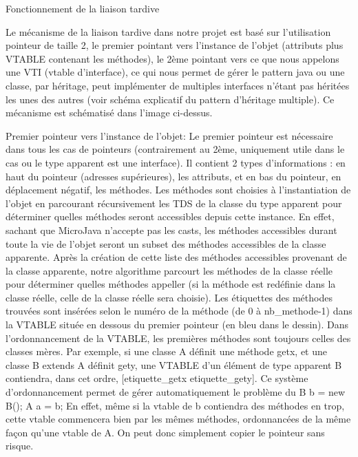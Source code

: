 Fonctionnement de la liaison tardive

Le mécanisme de la liaison tardive dans notre projet est basé sur l'utilisation pointeur de taille 2, le premier pointant vers l'instance de l'objet (attributs plus VTABLE contenant les méthodes), le 2ème pointant vers ce que nous appelons une VTI (vtable d'interface), ce qui nous permet de gérer le pattern java ou une classe, par héritage, peut implémenter de multiples interfaces n'étant pas héritées les unes des autres (voir schéma explicatif du pattern d'héritage multiple). Ce mécanisme est schématisé dans l'image ci-dessus.

Premier pointeur vers l'instance de l'objet:
Le premier pointeur est nécessaire dans tous les cas de pointeurs (contrairement au 2ème, uniquement utile dans le cas ou le type apparent est une interface). Il contient 2 types d'informations : en haut du pointeur (adresses supérieures), les attributs, et en bas du pointeur, en déplacement négatif, les méthodes. Les méthodes sont choisies à l'instantiation de l'objet en parcourant récursivement les TDS de la classe du type apparent pour déterminer quelles méthodes seront accessibles depuis cette instance. En effet, sachant que MicroJava n'accepte pas les casts, les méthodes accessibles durant toute la vie de l'objet seront un subset des méthodes accessibles de la classe apparente. Après la création de cette liste des méthodes accessibles provenant de la classe apparente, notre algorithme parcourt les méthodes de la classe réelle pour déterminer quelles méthodes appeller (si la méthode est redéfinie dans la classe réelle, celle de la classe réelle sera choisie). Les étiquettes des méthodes trouvées sont insérées selon le numéro de la méthode (de 0 à nb\_methode-1) dans la VTABLE située en dessous du premier pointeur (en bleu dans le dessin).
Dans l'ordonnancement de la VTABLE, les premières méthodes sont toujours celles des classes mères. Par exemple, si une classe A définit une méthode getx, et une classe B extends A définit gety, une VTABLE d'un élément de type apparent B contiendra, dans cet ordre, [etiquette\_getx etiquette\_gety]. Ce système d'ordonnancement permet de gérer automatiquement le problème du B b = new B(); A a = b; En effet, même si la vtable de b contiendra des méthodes en trop, cette vtable commencera bien par les mêmes méthodes, ordonnancées de la même façon qu'une vtable de A. On peut donc simplement copier le pointeur sans risque.

